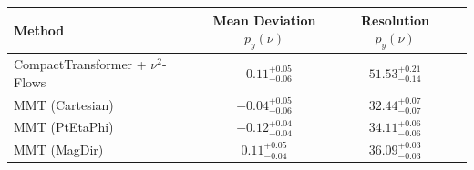     \begin{tabular}{lccc}
        \toprule
        Method & Mean Deviation $p_{y}(\nu)$ & Resolution $p_{y}(\nu)$ \\
        \midrule
        CompactTransformer + $\nu^2$-Flows & $-0.11^{+0.05}_{-0.06}$ & $51.53^{+0.21}_{-0.14}$ \\
        MMT (Cartesian) & $-0.04^{+0.05}_{-0.06}$ & $32.44^{+0.07}_{-0.07}$ \\
        MMT (PtEtaPhi) & $-0.12^{+0.04}_{-0.04}$ & $34.11^{+0.06}_{-0.06}$ \\
        MMT (MagDir) & $0.11^{+0.05}_{-0.04}$ & $36.09^{+0.03}_{-0.03}$ \\
        \bottomrule
    \end{tabular}
